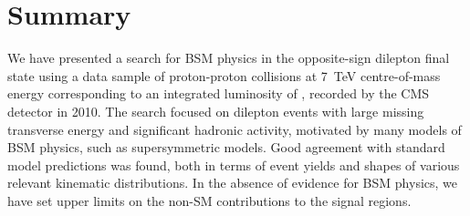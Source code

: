 \section{Summary}
\label{sec:conclusion}

We have presented a search for BSM physics in the opposite-sign dilepton final state using 
a data sample of proton-proton collisions at 7~TeV centre-of-mass energy corresponding to an integrated
luminosity of \lumifinal, recorded by the CMS detector in 2010.
The search focused on dilepton events with large missing transverse energy and significant hadronic activity,
motivated by many models of BSM physics, such as supersymmetric models.
Good agreement with standard model predictions was found, both in terms of event yields and shapes of 
various relevant kinematic distributions. In the absence of evidence for BSM physics, 
we have set upper limits on the non-SM contributions to the signal regions. 
